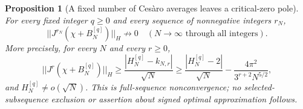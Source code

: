 \documentclass[11pt]{article}
\def\norm#1{||#1||}%
\newtheorem{proposition}[theorem]{Proposition}
\theoremstyle{remark}
\newcommand{\norm}[1]{\left\lVert #1\right\rVert}
\begin{document}
\begin{proposition}[A fixed number of Ces\`aro averages leaves a critical-zero pole]
\label{prop:ns65-cesaro-obstruction}
For every fixed integer $q\geq0$ and every sequence of nonnegative
integers $r_N$,
\[
 \norm{J^{r_N}(\chi+B_N^{[q]})}_H\not\longrightarrow0
 \quad(N\to\infty\text{ through all integers}).
\]
More precisely, for every $N$ and every $r\geq0$,
\begin{equation}
 \norm{J^r(\chi+B_N^{[q]})}_H
 \geq\frac{|H_N^{[q]}-k_{N,r}|}{\sqrt N}
 \geq\frac{|H_N^{[q]}-2|}{\sqrt N}
             -\frac{4\pi^2}{3^{r+2}N^{5/2}},
 \label{eq:ns65-averaged-witness}
\end{equation}
and $H_N^{[q]}\ne o(\sqrt N)$. This is full-sequence nonconvergence;
no selected-subsequence exclusion or assertion about signed optimal
approximation follows.
\end{proposition}
\end{document}
